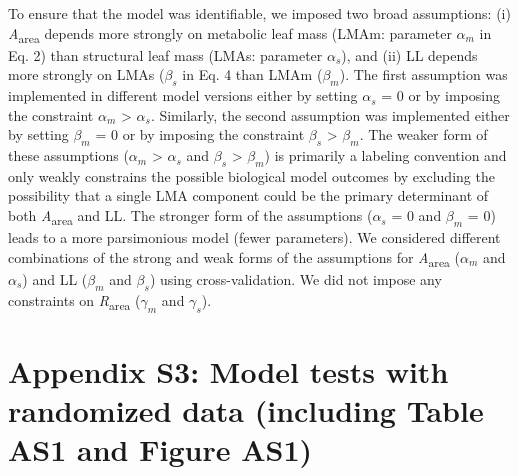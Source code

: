 \documentclass[
  12pt,
  letterpaper,
  DIV=11,
  numbers=noendperiod]{scrartcl}
\begin{document}
To ensure that the model was identifiable, we imposed two broad
assumptions: (i) \emph{A}\textsubscript{area} depends more strongly on
metabolic leaf mass (LMAm: parameter \(\alpha_m\) in Eq. 2) than
structural leaf mass (LMAs: parameter \(\alpha_s\)), and (ii) LL depends
more strongly on LMAs (\(\beta_s\) in Eq. 4 than LMAm (\(\beta_m\)). The
first assumption was implemented in different model versions either by
setting \(\alpha_s\) = 0 or by imposing the constraint \(\alpha_m\)
\textgreater{} \(\alpha_s\). Similarly, the second assumption was
implemented either by setting \(\beta_m\) = 0 or by imposing the
constraint \(\beta_s\) \textgreater{} \(\beta_m\). The weaker form of
these assumptions (\(\alpha_m\) \textgreater{} \(\alpha_s\) and
\(\beta_s\) \textgreater{} \(\beta_m\)) is primarily a labeling
convention and only weakly constrains the possible biological model
outcomes by excluding the possibility that a single LMA component could
be the primary determinant of both \emph{A}\textsubscript{area} and LL.
The stronger form of the assumptions (\(\alpha_s\) = 0 and \(\beta_m\) =
0) leads to a more parsimonious model (fewer parameters). We considered
different combinations of the strong and weak forms of the assumptions
for \emph{A}\textsubscript{area} (\(\alpha_m\) and \(\alpha_s\)) and LL
(\(\beta_m\) and \(\beta_s\)) using cross-validation. We did not impose
any constraints on \emph{R}\textsubscript{area} (\(\gamma_m\) and
\(\gamma_s\)).

\newpage

\hypertarget{appendix-s3-model-tests-with-randomized-data-including-table-as1-and-figure-as1}{%
\section{Appendix S3: Model tests with randomized data (including Table
AS1 and Figure
AS1)}\label{appendix-s3-model-tests-with-randomized-data-including-table-as1-and-figure-as1}}
\end{document}
